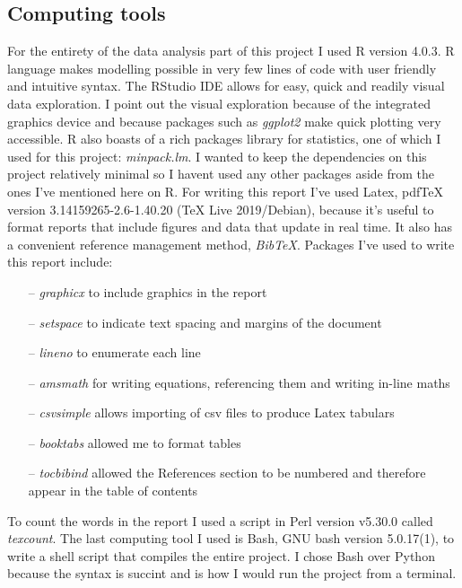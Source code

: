 \documentclass[11pt]{article}
\begin{document}
    \subsection{Computing tools}
    For the entirety of the data analysis part of this project I used R version 4.0.3. R language makes modelling possible in very few lines of code with user friendly and intuitive syntax. The RStudio IDE allows for easy, quick and readily visual data exploration. I point out the visual exploration because of the integrated graphics device and because packages such as \emph{ggplot2} make quick plotting very accessible. R also boasts of a rich packages library for statistics, one of which I used for this project: \emph{minpack.lm}. I wanted to keep the dependencies on this project relatively minimal so I havent used any other packages aside from the ones I've mentioned here on R. For writing this report I've used Latex, pdfTeX version 3.14159265-2.6-1.40.20 (TeX Live 2019/Debian), because it's useful to format reports that include figures and data that update in real time. It also has a convenient reference management method, \emph{BibTeX}. Packages I've used to write this report include:

    \begin{itemize}
      \item[--] \emph{graphicx} to include graphics in the report
      \item[--] \emph{setspace} to indicate text spacing and margins of the document
      \item[--] \emph{lineno} to enumerate each line
      \item[--] \emph{amsmath} for writing equations, referencing them and writing in-line maths
      \item[--] \emph{csvsimple} allows importing of csv files to produce Latex tabulars
      \item[--] \emph{booktabs} allowed me to format tables
      \item[--] \emph{tocbibind} allowed the References section to be numbered and therefore appear in the table of contents 
    \end{itemize}

    To count the words in the report I used a script in Perl version v5.30.0 called \emph{texcount}. The last computing tool I used is Bash, GNU bash version 5.0.17(1), to write a shell script that compiles the entire project. I chose Bash over Python because the syntax is succint and is how I would run the project from a terminal.
  
\end{document}
